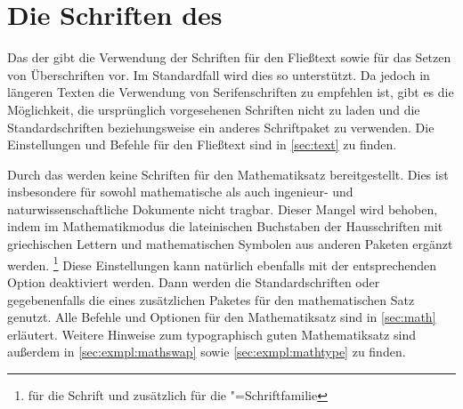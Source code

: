 \section{Die Schriften des \CDs}
\label{sec:fonts}
%
Das \CD der \TnUD gibt die Verwendung der Schriften \Univers für den Fließtext 
sowie \DIN für das Setzen von Überschriften vor. Im Standardfall wird dies so 
unterstützt. Da jedoch in längeren Texten die Verwendung von Serifenschriften 
zu empfehlen ist, gibt es die Möglichkeit, die ursprünglich vorgesehenen 
Schriften nicht zu laden und die Standardschriften beziehungsweise ein anderes 
Schriftpaket zu verwenden. Die Einstellungen und Befehle für den Fließtext sind 
in \autoref{sec:text} zu finden.

Durch das \CD werden keine Schriften für den Mathematiksatz bereitgestellt. 
Dies ist insbesondere für sowohl mathematische als auch ingenieur- und 
naturwissenschaftliche Dokumente nicht tragbar. Dieser Mangel wird behoben, 
indem im Mathematikmodus die lateinischen Buchstaben der Hausschriften mit 
griechischen Lettern und mathematischen Symbolen aus anderen Paketen ergänzt 
werden.%
\footnote{%
   für die Schrift \DIN und zusätzlich  für 
  die \Univers"=Schriftfamilie%
}
Diese Einstellungen kann natürlich ebenfalls mit der entsprechenden Option 
deaktiviert werden. Dann werden die Standardschriften oder gegebenenfalls die 
eines zusätzlichen Paketes für den mathematischen Satz genutzt. Alle Befehle 
und Optionen für den Mathematiksatz sind in \autoref{sec:math} erläutert. 
Weitere Hinweise zum typographisch guten Mathematiksatz sind außerdem in 
\autoref{sec:exmpl:mathswap} sowie \autoref{sec:exmpl:mathtype} zu finden.


